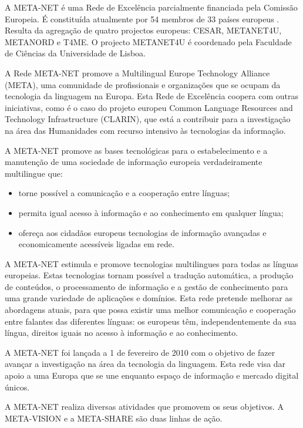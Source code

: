 \begin{multicols}{2} 

A META-NET é uma Rede de Excelência parcialmente financiada pela Comissão Europeia.
É constituída atualmente por 54 membros de 33 países europeus \cite{rehm2011}. 
Resulta da agregação de quatro projectos europeus: CESAR, METANET4U, METANORD e T4ME.
O projecto METANET4U é coordenado pela Faculdade de Ciências da Universidade de Lisboa.

A Rede META-NET promove a Multilingual Europe Technology Alliance (META), 
uma comunidade de profissionais e organizações que se ocupam da tecnologia da linguagem na Europa.
Esta Rede de Excelência coopera com outras iniciativas, como é o caso do projeto europeu Common Language Resources and Technology Infrastructure 
(CLARIN), que está a contribuir para a investigação na área das Humanidades com recurso intensivo às tecnologias da informação. 

A META-NET promove as bases tecnológicas para o estabelecimento e a manutenção de uma sociedade de informação europeia verdadeiramente multilingue que:

\begin{itemize}
  \item torne possível a comunicação e a cooperação entre línguas;
  \item permita igual acesso à informação e ao conhecimento em qualquer língua;
  \item ofereça aos cidadãos europeus tecnologias de informação avançadas e economicamente acessíveis ligadas em rede.
\end{itemize}

A META-NET estimula e promove tecnologias multilingues para todas as línguas europeias. Estas tecnologias tornam possível a tradução automática, a produção de conteúdos, o processamento de informação e a gestão de conhecimento para uma grande variedade de aplicações e domínios. Esta rede pretende melhorar as abordagens atuais, para que possa existir uma melhor comunicação e cooperação entre falantes das diferentes línguas: os europeus têm, independentemente da sua língua, direitos iguais no acesso à informação e ao conhecimento. 

 A META-NET foi lançada a 1 de fevereiro de 2010 com o objetivo de fazer avançar a investigação na área da tecnologia da linguagem. 
Esta rede visa dar apoio a uma Europa que se une enquanto espaço de informação e mercado digital únicos.

A META-NET realiza diversas atividades que promovem os seus objetivos. A META-VISION e a META-SHARE são duas 
linhas de ação.


\end{multicols}
